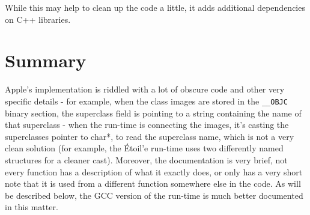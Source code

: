 While this may help to clean up the code a little, it adds additional dependencies on C++ libraries.

\section{Summary}
Apple's implementation is riddled with a lot of obscure code and other very specific details - for example, when the class images are stored in the \verb=__OBJC= binary section, the superclass field is pointing to a string containing the name of that superclass - when the run-time is connecting the images, it's casting the superclasses pointer to char*, to read the superclass name, which is not a very clean solution (for example, the \'Etoil'e run-time uses two differently named structures for a cleaner cast). Moreover, the documentation is very brief, not every function has a description of what it exactly does, or only has a very short note that it is used from a different function somewhere else in the code. As will be described below, the GCC version of the run-time is much better documented in this matter.
